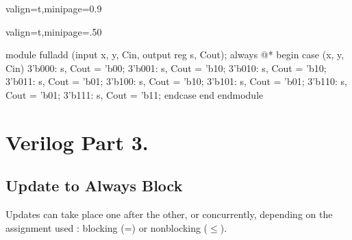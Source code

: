 \documentclass[12pt,openany]{book}
\begin{document}
\vfill
\begin{adjustbox}{valign=t,minipage={0.9\textwidth}}
\hfill
\noindent
\begin{adjustbox}{valign=t,minipage={.50\textwidth}}
\small
\begin{vhdl}
module fulladd (input x, y, Cin, output reg s, Cout);
	always @*
	begin
		case ({x, y, Cin})
		3'b000: {s, Cout} = 'b00;
		3'b001: {s, Cout} = 'b10;
		3'b010: {s, Cout} = 'b10;
		3'b011: {s, Cout} = 'b01;
		3'b100: {s, Cout} = 'b10;
		3'b101: {s, Cout} = 'b01;
		3'b110: {s, Cout} = 'b01;
		3'b111: {s, Cout} = 'b11;
		endcase
	end
endmodule
\end{vhdl}
\end{adjustbox}
\end{adjustbox}





\section{Verilog Part 3.}
\subsection{Update to Always Block}
Updates can take place one after the other, or concurrently, depending on the assignment used : blocking (=) or nonblocking ($\leq$). \newline
\vspace*{-20px}
\end{document}
